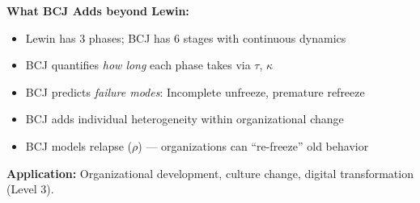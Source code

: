 \begin{tcolorbox}[colback=green!5!white, colframe=green!75!black,
    title=Theorem BCJ-T30: Lewin Change Model as Special Case]
\textbf{What BCJ Adds beyond Lewin:}
\begin{itemize}[nosep]
\item Lewin has 3 phases; BCJ has 6 stages with continuous dynamics
\item BCJ quantifies \textit{how long} each phase takes via $\tau$, $\kappa$
\item BCJ predicts \textit{failure modes}: Incomplete unfreeze, premature refreeze
\item BCJ adds individual heterogeneity within organizational change
\item BCJ models relapse ($\rho$) --- organizations can ``re-freeze'' old behavior
\end{itemize}

\textbf{Application:} Organizational development, culture change, digital transformation (Level 3).
\end{tcolorbox}

